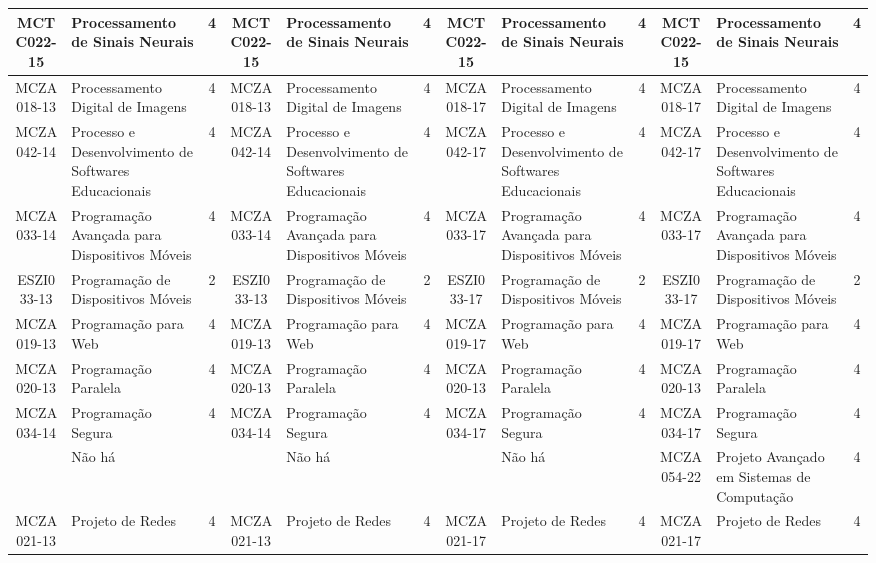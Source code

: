 \documentclass[a4paper]{article}
\begin{document}
\begin{landscape}
{\begin{longtable}{|c|p{.2\textheight}|c||c|p{.2\textheight}|c||c|p{.2\textheight}|c||c|p{.2\textheight}|c|}
MCTC022-15 & Processamento de Sinais Neurais & 4 &
MCTC022-15 & Processamento de Sinais Neurais & 4 &
MCTC022-15 & Processamento de Sinais Neurais & 4 &
MCTC022-15 & Processamento de Sinais Neurais & 4\\ \hline

MCZA018-13 & Processamento Digital de Imagens & 4 &
MCZA018-13 & Processamento Digital de Imagens & 4 &
MCZA018-17 & Processamento Digital de Imagens & 4 &
MCZA018-17 & Processamento Digital de Imagens & 4\\ \hline

MCZA042-14 & Processo e Desenvolvimento de Softwares Educacionais & 4 &
MCZA042-14 & Processo e Desenvolvimento de Softwares Educacionais & 4 &
MCZA042-17 & Processo e Desenvolvimento de Softwares Educacionais & 4 & 
MCZA042-17 & Processo e Desenvolvimento de Softwares Educacionais & 4\\ \hline

MCZA033-14 & Programação Avançada para Dispositivos Móveis & 4 &
MCZA033-14 & Programação Avançada para Dispositivos Móveis & 4 &
MCZA033-17 & Programação Avançada para Dispositivos Móveis & 4 & 
MCZA033-17 & Programação Avançada para Dispositivos Móveis & 4\\ \hline

ESZI033-13 & Programação de Dispositivos Móveis & 2 &
ESZI033-13 & Programação de Dispositivos Móveis & 2 &
ESZI033-17 & Programação de Dispositivos Móveis & 2 &
ESZI033-17 & Programação de Dispositivos Móveis & 2\\ \hline

MCZA019-13 & Programação para Web & 4 &
MCZA019-13 & Programação para Web & 4 &
MCZA019-17 & Programação para Web & 4 &
MCZA019-17 & Programação para Web & 4\\ \hline

MCZA020-13 & Programação Paralela & 4 &
MCZA020-13 & Programação Paralela & 4 &
MCZA020-13 & Programação Paralela & 4 & 
MCZA020-13 & Programação Paralela & 4\\ \hline

MCZA034-14 & Programação Segura & 4 &
MCZA034-14 & Programação Segura & 4 &
MCZA034-17 & Programação Segura & 4 &
MCZA034-17 & Programação Segura & 4\\ \hline

& Não há & &
& Não há & & 
& Não há & & 
MCZA054-22 & Projeto Avançado em Sistemas de Computação & 4\\ \hline

MCZA021-13 & Projeto de Redes & 4 &
MCZA021-13 & Projeto de Redes & 4 &
MCZA021-17 & Projeto de Redes & 4 &
MCZA021-17 & Projeto de Redes & 4\\ \hline


\end{longtable}}
\end{landscape}
\end{document}

